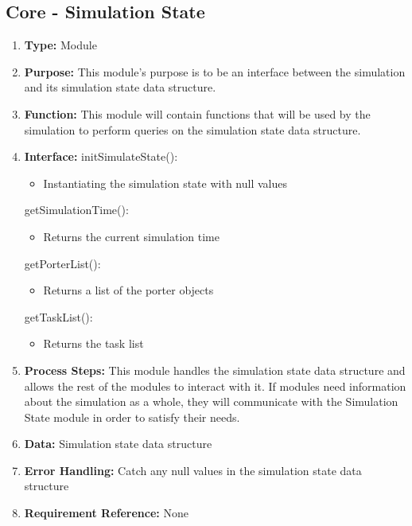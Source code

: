 \documentclass[paper=letter, fontsize=10pt]{scrartcl}
\numberwithin{equation}{section}		%
\numberwithin{figure}{section}			%
\numberwithin{table}{section}				%
\begin{document}
\subsection{Core - Simulation State}
\begin{enumerate}[]
	\item \textbf{Type:} Module
	\item \textbf{Purpose:} This module's purpose is to be an interface between the simulation and its simulation state data structure.
	\item \textbf{Function:} This module will contain functions that will be used by the simulation to perform queries on the simulation state data structure.
	\item \textbf{Interface:}\newline
	initSimulateState():
		\begin{itemize}
			\item Instantiating the simulation state with null values
		\end{itemize}
	getSimulationTime():
		\begin{itemize}
			\item Returns the current simulation time
		\end{itemize}
	getPorterList():
		\begin{itemize}
			\item Returns a list of the porter objects
		\end{itemize}
	getTaskList():
		\begin{itemize}
			\item Returns the task list
		\end{itemize}			
	\item \textbf{Process Steps:} This module handles the simulation state data structure and allows the rest of the modules to interact with it.  If modules need information about the simulation as a whole, they will communicate with the Simulation State module in order to satisfy their needs. 
	\item \textbf{Data:} Simulation state data structure
	\item \textbf{Error Handling:} Catch any null values in the simulation state data structure
	\item \textbf{Requirement Reference:} None
\end{enumerate}
\end{document}

